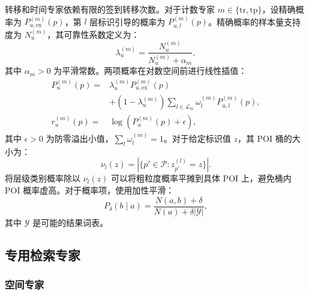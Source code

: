 \documentclass[10pt,fontset=none,twocolumn]{ctexart}
\newcommand{\POIs}{\mathcal{P}}
\begin{document}
转移和时间专家依赖有限的签到转移次数。对于计数专家 $m\in\{\mathrm{tr},\mathrm{tp}\}$，设精确概率为 $P_{u,\mathrm{ex}}^{(m)}(p)$，第 $l$ 层标识引导的概率为 $P_{u,l}^{(m)}(p)$。精确概率的样本量支持度为 $N_u^{(m)}$，其可靠性系数定义为：
\begin{equation}
\lambda_{u}^{(m)}
=
\frac{N_{u}^{(m)}}{N_{u}^{(m)}+\alpha_m},
\label{eq:reliability}
\end{equation}
其中 $\alpha_m>0$ 为平滑常数。两项概率在对数空间前进行线性插值：
\begin{align}
P_u^{(m)}(p)
={}&
\lambda_u^{(m)}P_{u,\mathrm{ex}}^{(m)}(p)
\nonumber\\
&+
(1-\lambda_u^{(m)})
\sum_{l\in\mathcal{L}_m}
\omega_l^{(m)}P_{u,l}^{(m)}(p),
\label{eq:unified_backoff_probability}\\
r_u^{(m)}(p)
={}&
\log\!\left(P_u^{(m)}(p)+\epsilon\right),
\label{eq:unified_backoff}
\end{align}
其中 $\epsilon>0$ 为防零溢出小值，$\sum_l\omega_l^{(m)}=1$。对于给定标识值 $z$，其 POI 桶的大小为：
\begin{equation}
\nu_l(z)
=
\left|\{p'\in\POIs:z_{p'}^{(l)}=z\}\right|.
\label{eq:identifier_bucket_size}
\end{equation}
将层级类别概率除以 $\nu_l(z)$ 可以将粗粒度概率平摊到具体 POI 上，避免桶内 POI 概率虚高。对于概率项，使用加性平滑：
\begin{equation}
P_{\delta}(b\mid a)
=
\frac{N(a,b)+\delta}{N(a)+\delta|\mathcal{Y}|},
\label{eq:additive_smoothing}
\end{equation}
其中 $\mathcal{Y}$ 是可能的结果词表。

\subsection{专用检索专家}
\label{subsec:experts}

\subsubsection{空间专家}
\end{document}
